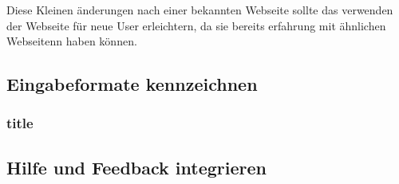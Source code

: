 \documentclass[10pt]{article}
\newcounter{subsubsubsection}[subsubsection]
\begin{document}
	Diese Kleinen änderungen nach einer bekannten Webseite sollte das verwenden der Webseite für neue User erleichtern, da sie bereits erfahrung mit ähnlichen Webseitenn haben können.
	
	
	\subsection{Eingabeformate kennzeichnen}
	\subsubsection{title}
	\subsection{Hilfe und Feedback integrieren}
	
	
	
\end{document}
